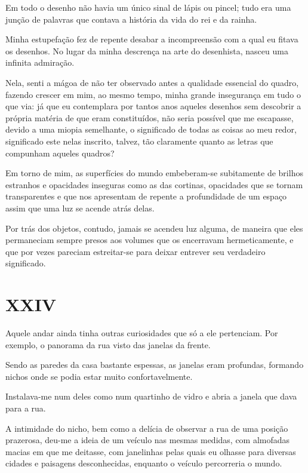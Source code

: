 Em todo o desenho não havia um único sinal de lápis ou pincel; tudo era uma junção de palavras que contava a história da vida do rei e da rainha.

Minha estupefação fez de repente desabar a incompreensão com a qual eu fitava os desenhos. No lugar da minha descrença na arte do desenhista, nasceu uma infinita admiração.

Nela, senti a mágoa de não ter observado antes a qualidade essencial do quadro, fazendo crescer em mim, ao mesmo tempo, minha grande insegurança em tudo o que via: já que eu contemplara por tantos anos aqueles desenhos sem descobrir a própria matéria de que eram constituídos, não seria possível que me escapasse, devido a uma miopia semelhante, o significado de todas as coisas ao meu redor, significado este nelas inscrito, talvez, tão claramente quanto as letras que compunham aqueles quadros?

Em torno de mim, as superfícies do mundo embeberam-se subitamente de brilhos estranhos e opacidades inseguras como as das cortinas, opacidades que se tornam transparentes e que nos apresentam de repente a profundidade de um espaço assim que uma luz se acende atrás delas.

Por trás dos objetos, contudo, jamais se acendeu luz alguma, de maneira que eles permaneciam sempre presos aos volumes que os encerravam hermeticamente, e que por vezes pareciam estreitar-se para deixar entrever seu verdadeiro significado.


\chapter*{\centering\Large{XXIV}}

Aquele andar ainda tinha outras curiosidades que só a ele pertenciam. Por exemplo, o panorama da rua visto das janelas da frente.

Sendo as paredes da casa bastante espessas, as janelas eram profundas, formando nichos onde se podia estar muito confortavelmente.

Instalava-me num deles como num quartinho de vidro e abria a janela que dava para a rua. 

A intimidade do nicho, bem como a delícia de observar a rua de uma posição prazerosa, deu-me a ideia de um veículo nas mesmas medidas, com almofadas macias em que me deitasse, com janelinhas pelas quais eu olhasse para diversas cidades e paisagens desconhecidas, enquanto o veículo percorreria o mundo.

